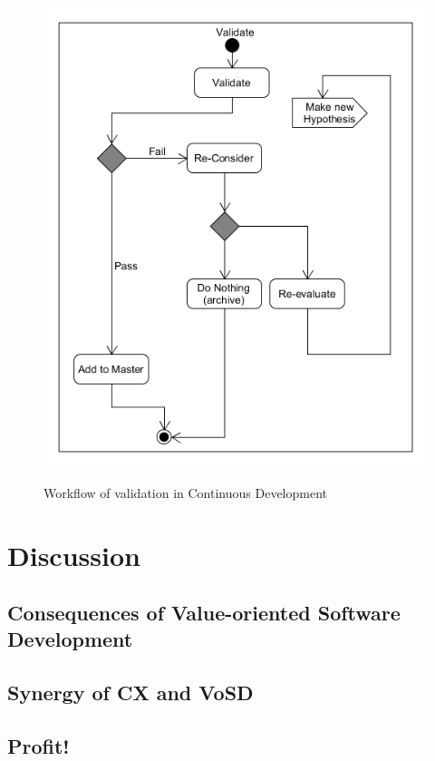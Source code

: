 \documentclass{sig-alternate}
\begin{document}
\begin{figure}
\centering
\caption{Workflow of validation in Continuous Development}
\includegraphics[scale=0.4]{Umlet/ValidateActivity}
\label{fig:validation}
\end{figure}

\section{Discussion}

\subsection{Consequences of Value-oriented Software Development}
\subsection{Synergy of CX and VoSD}

\subsection{Profit!}
\end{document}
